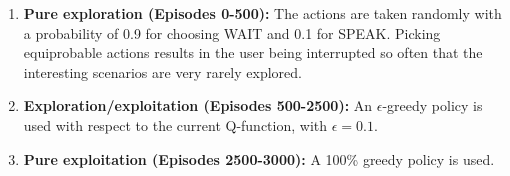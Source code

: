         \begin{enumerate}
        	\item \textbf{Pure exploration (Episodes 0-500):} The actions are taken randomly with a probability of 0.9 for choosing WAIT and 0.1 for SPEAK. Picking equiprobable actions results in the user being interrupted so often that the interesting scenarios are very rarely explored.
            \item \textbf{Exploration/exploitation (Episodes 500-2500):} An $\epsilon$-greedy policy is used with respect to the current Q-function, with $\epsilon=0.1$.
            \item \textbf{Pure exploitation (Episodes 2500-3000):} A 100\% greedy policy is used.
        \end{enumerate}
				
